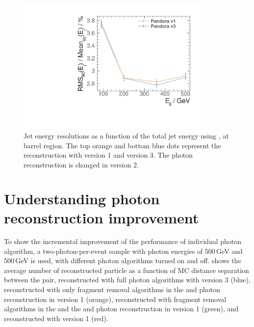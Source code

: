 



\begin{figure}[tbph]
\centering
\includegraphics[width=0.85\textwidth]{photon/JERnew.pdf}
\caption[Jet energy resolution as a function of the di-jet energy]
{Jet energy resolutions as a function of the total jet energy using \eeZuds, at barrel region. The top orange and bottom blue dots represent the  reconstruction with \pandora version 1 and version 3. The photon reconstruction is changed in \pandora version 2.}
\label{fig:photonJER}
\end{figure}


\section{Understanding photon reconstruction improvement}





To show the incremental improvement of the performance of individual photon algorithm, a two-photon-per-event sample with photon energies of  500\,GeV and 500\,GeV is used, with different photon algorithms turned on and off.  shows the average number of reconstructed particle as a function of MC distance separation between the pair, reconstructed with full photon algorithms with \pandora version 3 (blue), reconstructed with only fragment removal algorithms in the \ECAL and photon reconstruction in  \pandora version 1 (orange), reconstructed with fragment removal algorithms in the \ECAL and the \HCAL and photon reconstruction in  \pandora version 1 (green), and reconstructed with \pandora version 1 (red).

